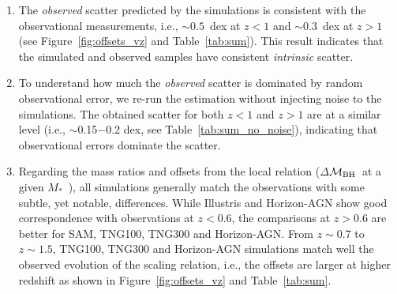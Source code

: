 \documentclass[twocolumn]{aastex631}
\newcommand{\ding}[1]{\textcolor{red}{[{\bf Xuheng}: #1]}}
\def\smass{{$M_*$}}
\def\mbh{$\mathcal M_{\rm BH}$}
\begin{document}
\begin{enumerate}

\item{}The {\it observed} scatter predicted by the simulations is consistent with the observational measurements, i.e., $\sim0.5$~dex at $z<1$ and $\sim0.3$~dex at $z>1$ (see Figure~\ref{fig:offsets_vz} and Table~\ref{tab:sum}). This result indicates that the simulated and observed samples have consistent {\it intrinsic} scatter.

\item{}To understand how much the {\it observed} scatter is dominated by random observational error,
we re-run the estimation without injecting noise to the simulations. The obtained scatter for both $z<1$ and $z>1$ are at a similar level (i.e.,  $\sim$0.15$-$0.2 dex, see Table~\ref{tab:sum_no_noise}), indicating that observational errors dominate the scatter.

\item{} Regarding the mass ratios and offsets from the local relation ($\Delta$\mbh\ at a given \smass\ ), all simulations generally match the observations with some subtle, yet notable, differences. While Illustris and Horizon-AGN show good correspondence with observations at $z<0.6$, the comparisons at $z>0.6$ are better for SAM, TNG100, TNG300 and Horizon-AGN. From $z\sim0.7$ to $z\sim1.5$, TNG100, TNG300 and Horizon-AGN simulations match well the observed evolution of the scaling relation, i.e., the offsets are larger at higher redshift as shown in Figure~\ref{fig:offsets_vz} and Table~\ref{tab:sum}. 
\end{enumerate}
\end{document}
